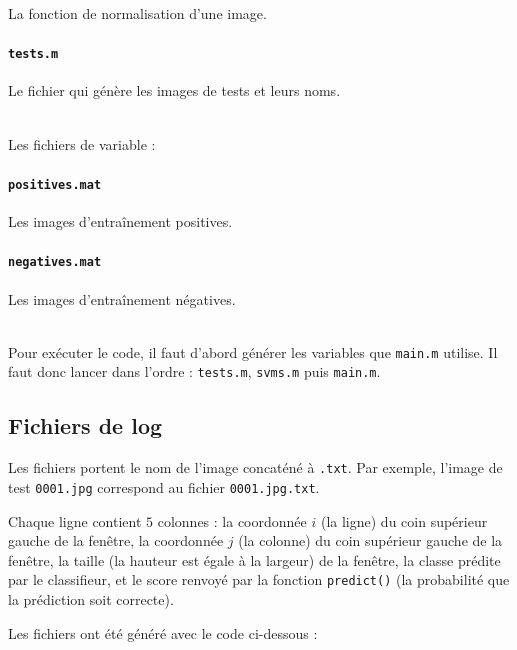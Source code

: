 \documentclass[11pt]{report}
\begin{document}
La fonction de normalisation d'une image.

\paragraph*{\protect\Verb+tests.m+}

Le fichier qui génère les images de tests et leurs noms.

~\\
Les fichiers de variable :

\paragraph*{\protect\Verb+positives.mat+}

Les images d'entraînement positives.

\paragraph*{\protect\Verb+negatives.mat+}

Les images d'entraînement négatives.

~\\
Pour exécuter le code, il faut d'abord générer les variables que \verb|main.m| utilise. Il faut donc lancer dans l'ordre : \verb|tests.m|, \verb|svms.m| puis \verb|main.m|.

\subsection*{Fichiers de log}

Les fichiers portent le nom de l'image concaténé à \verb|.txt|. Par exemple, l'image de test \verb|0001.jpg| correspond au fichier \verb|0001.jpg.txt|. 

Chaque ligne contient $5$ colonnes : la coordonnée $i$ (la ligne) du coin supérieur gauche de la fenêtre, la coordonnée $j$ (la colonne) du coin supérieur gauche de la fenêtre, la taille (la hauteur est égale à la largeur) de la fenêtre, la classe prédite par le classifieur, et le score renvoyé par la fonction \verb|predict()| (la probabilité que la prédiction soit correcte).

Les fichiers ont été généré avec le code ci-dessous :
\end{document}
